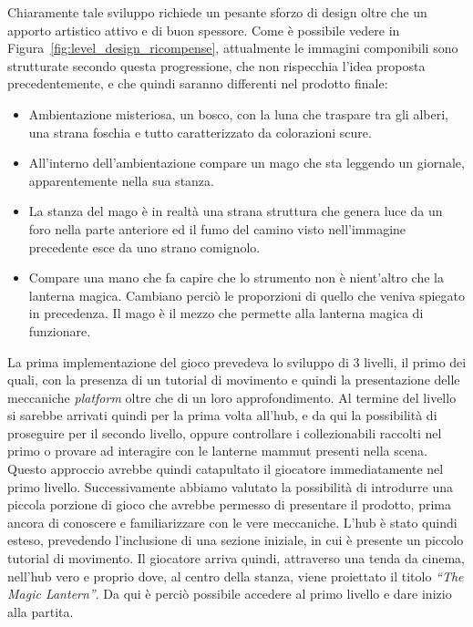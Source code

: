 Chiaramente tale sviluppo richiede un pesante sforzo di design oltre che un apporto artistico attivo e di buon spessore.
Come è possibile vedere in Figura~\ref{fig:level_design_ricompense}, attualmente le immagini componibili sono strutturate secondo questa progressione, che non rispecchia l’idea proposta precedentemente, e che quindi saranno differenti nel prodotto finale:
\begin{itemize}
	\item Ambientazione misteriosa, un bosco, con la luna che traspare tra gli alberi, una strana foschia e tutto caratterizzato da colorazioni scure.
	\item All’interno dell’ambientazione compare un mago che sta leggendo un giornale, apparentemente nella sua stanza.
	\item La stanza del mago è in realtà una strana struttura che genera luce da un foro nella parte anteriore ed il fumo del camino visto nell’immagine precedente esce da uno strano comignolo.
	\item Compare una mano che fa capire che lo strumento non è nient’altro che la lanterna magica. Cambiano perciò le proporzioni di quello che veniva spiegato in precedenza. Il mago è il mezzo che permette alla lanterna magica di funzionare.
\end{itemize}

La prima implementazione del gioco prevedeva lo sviluppo di 3 livelli, il primo dei quali, con la presenza di un tutorial di movimento e quindi la presentazione delle meccaniche \textit{platform} oltre che di un loro approfondimento. Al termine del livello si sarebbe arrivati quindi per la prima volta all’hub, e da qui la possibilità di proseguire per il secondo livello, oppure controllare i collezionabili raccolti nel primo o provare ad interagire con le lanterne mammut presenti nella scena.
Questo approccio avrebbe quindi catapultato il giocatore immediatamente nel primo livello. Successivamente abbiamo valutato la possibilità di introdurre una piccola porzione di gioco che avrebbe permesso di presentare il prodotto, prima ancora di conoscere e familiarizzare con le vere meccaniche.
L’hub è stato quindi esteso, prevedendo l’inclusione di una sezione iniziale, in cui è presente un piccolo tutorial di movimento. Il giocatore arriva quindi, attraverso una tenda da cinema, nell’hub vero e proprio dove, al centro della stanza, viene proiettato il titolo \textit{“The Magic Lantern”}. Da qui è perciò possibile accedere al primo livello e dare inizio alla partita.

